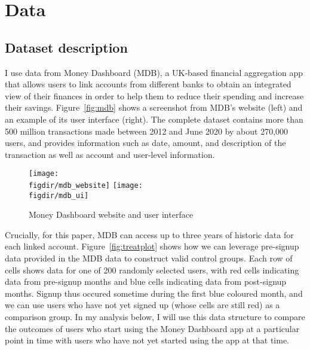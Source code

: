 
\section{Data}%
\label{sec:data}

\subsection{Dataset description}%
\label{sub:dataset_description}

I use data from Money Dashboard (MDB), a UK-based financial aggregation app
that allows users to link accounts from different banks to obtain an integrated
view of their finances in order to help them to reduce their spending and
increase their savings. Figure~\ref{fig:mdb} shows a screenshot from MDB's
website (left) and an example of its user interface (right). The complete
dataset contains more than 500 million transactions made between 2012 and June
2020 by about 270,000 users, and provides information such as date, amount, and
description of the transaction as well as account and user-level information.

\begin{figure}[h]
    \centering
    \caption{Money Dashboard website and user interface}%
    \texttt{[image: \\figdir/mdb\_website]}
    \texttt{[image: \\figdir/mdb\_ui]}
    \label{fig:mdb_website}
\end{figure}

Crucially, for this paper, MDB can access up to three years of historic data
for each linked account. Figure~\ref{fig:treatplot} shows how we can leverage
pre-signup data provided in the MDB data to construct valid control groups.
Each row of cells shows data for one of 200 randomly selected users, with red
cells indicating data from pre-signup months and blue cells indicating data
from post-signup months. Signup thus occured sometime during the first blue
coloured month, and we can use users who have not yet signed up (whose cells
are still red) as a comparison group. In my analysis below, I will use this
data structure to compare the outcomes of users who start using the Money
Dashboard app at a particular point in time with users who have not yet started
using the app at that time.

